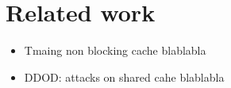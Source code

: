 \section{Related work}
    \begin{itemize}
        \item \cite{Heechul_taming_non_blocking_caches} Tmaing non blocking cache blablabla
        \item \cite{Heechul_DDOS_attacks_on_shared_cache} DDOD: attacks on shared cahe blablabla
    \end{itemize}

